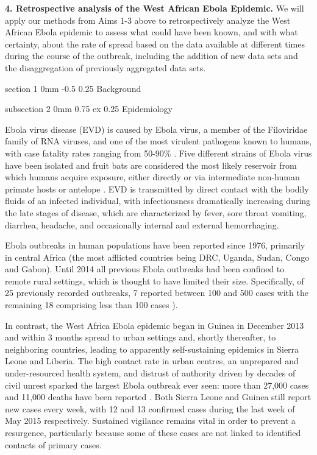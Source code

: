 \documentclass[12pt]{article}
\makeatletter
\renewcommand{\section}{\@startsection  %
{section}%
{1}%
{0mm}%
{-0.5\baselineskip}%
{0.25\baselineskip}%
{\normalfont\Large\bfseries}}%
\renewcommand{\subsection}%
{\vspace{0.0ex \@plus 3.0ex \@minus 1.0ex}\@startsection  %
{subsection}%
{2}%
{0mm}%
{0.75\baselineskip \@plus 0.25 ex}%
{0.25\baselineskip}%
{\normalfont\large\bfseries}}%
\makeatother
\begin{document}
\begin{hangparas}{.25in}{1}\textbf{4. Retrospective analysis of the West African Ebola Epidemic.} We will apply our methods from Aims 1-3 above to retrospectively analyze the West African Ebola epidemic to assess what could have been known, and with what certainty, about the rate of spread based on the data available at different times during the course of the outbreak, including the addition of new data sets and the disaggregation of previously aggregated data sets.  \end{hangparas}

\section{Background}

\subsection{Epidemiology}

Ebola virus disease (EVD) is caused by Ebola virus, a member of the Filoviridae family of RNA viruses, and one of the most virulent pathogens known to humans, with case fatality rates ranging from 50-90\% \cite{Leroy2011,YamiGert15}. Five different strains of Ebola virus have been isolated and fruit bats are considered the most likely reservoir from which humans acquire exposure, either directly or via intermediate non-human primate hosts or antelope \cite{Chowell2014}. EVD is transmitted by direct contact with the bodily fluids of an infected individual, with infectiousness dramatically increasing during the late stages of disease, which are characterized by fever, sore throat vomiting, diarrhea, headache, and occasionally internal and external hemorrhaging.

Ebola outbreaks in human populations have been reported since 1976, primarily in central Africa (the most afflicted countries being DRC, Uganda, Sudan, Congo and Gabon). Until 2014 all previous Ebola outbreaks had been confined to remote rural settings, which is thought to have limited their size. Specifically, of 25 previously recorded outbreaks, 7 reported between 100 and 500 cases with the remaining 18 comprising less than  100 cases \cite{Groseth2007a}).

In contrast, the West Africa Ebola epidemic began in Guinea in December 2013 and within 3 months spread to urban settings and, shortly thereafter, to neighboring countries, leading to apparently self-sustaining epidemics in Sierra Leone and Liberia. The high contact rate in urban centres, an unprepared and under-resourced health system, and distrust of authority driven by decades of civil unrest sparked the largest Ebola outbreak ever seen: more than 27,000 cases and 11,000 deaths have been reported \cite{AlexSand15}. Both Sierra Leone and Guinea still report new cases every week, with 12 and 13 confirmed cases during the last week of May 2015 respectively. Sustained vigilance remains vital in order to prevent a resurgence, particularly because some of these cases are not linked to identified contacts of primary cases.
\end{document}
